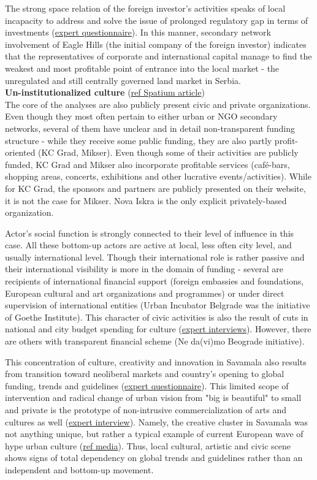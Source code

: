 \documentclass[11pt]{report}
\begin{document}
The strong space relation of the foreign investor's activities speaks of local incapacity to address and solve the issue of prolonged regulatory gap in terms of investments (\href{}{expert questionnaire}).
In this manner, secondary network involvement of Eagle Hills (the initial company of the foreign investor) indicates that the representatives of corporate and international capital manage to find the weakest and most profitable point of entrance into the local market - the unregulated and still centrally governed land market in Serbia.
\\

\textbf{Un-institutionalized culture} (\href{}{ref Spatium article})
\\
The core of the analyses are also publicly present civic and private organizations.
Even though they most often pertain to either urban or NGO secondary networks, several of them have unclear and in detail non-transparent funding structure - while they receive some public funding, they are also partly profit-oriented (KC Grad, Mikser).
Even though some of their activities are publicly funded, KC Grad and Mikser also incorporate profitable services (café-bars, shopping areas, concerts, exhibitions and other lucrative events/activities).
While for KC Grad, the sponsors and partners are publicly presented on their website, it is not the case for Mikser.
Nova Iskra is the only explicit privately-based organization.

Actor’s social function is strongly connected to their level of influence in this case.
All these bottom-up actors are active at local, less often city level, and usually international level. Though their international role is rather passive and their international visibility is more in the domain of funding - several are recipients of international financial support (foreign embassies and foundations, European cultural and art organizations and programmes) or under direct supervision of international entities (Urban Incubator Belgrade was the initiative of Goethe Institute).
This character of civic activities is also the result of cuts in national and city budget spending for culture (\href{}{expert interviews}).
However, there are others with transparent financial scheme (Ne da(vi)mo Beograde initiative). 

This concentration of culture, creativity and innovation in Savamala also results from transition toward neoliberal markets and country's opening to global funding, trends and guidelines (\href{}{expert questionnaire}).
This limited scope of intervention and radical change of urban vision from "big is beautiful" to small and private is the prototype of non-intrusive commercialization of arts and cultures as well (\href{}{expert interview}).
Namely, the creative cluster in Savamala was not anything unique, but rather a typical example of current European wave of hype urban culture (\href{}{ref media}).
Thus, local cultural, artistic and civic scene shows signs of total dependency on global trends and guidelines rather than an independent and bottom-up movement. 
\end{document}
